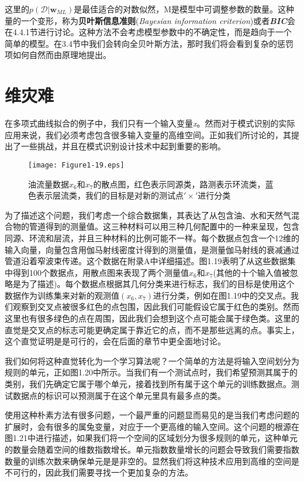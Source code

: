 	这里的$p(\mathcal{D}| \textbf{w}_{ML})$是最佳适合的对数似然，M是模型中可调整参数的数量。这种量的一个变形，称为\textbf{贝叶斯信息准则}(\textit{Bayesian information criterion})或者\textit{\textbf{BIC}}会在4.4.1节进行讨论。这种方法不会考虑模型参数中的不确定性，而是趋向于一个简单的模型。在3.4节中我们会转向全贝叶斯方法，那时我们将会看到复杂的惩罚项如何自然而由原理地提出。
	
\section{维灾难}
	在多项式曲线拟合的例子中，我们只有一个输入变量\textit{x}。然而对于模式识别的实际应用来说，我们必须考虑包含很多输入变量的高维空间。正如我们所讨论的，其提出了一些挑战，并且在模式识别设计技术中起到重要的影响。
	
	\begin{figure}[t]
		\parbox{.4\textwidth}{\caption{ 油流量数据$x_6$和$x_7$的散点图，红色表示同源类，路测表示环流类，蓝色表示层流类，我们的目标是对新的测试点$'\times'$进行分类 }}
		\parbox{.5\textwidth}{\texttt{[image: Figure1-19.eps]}}
	\end{figure}
	
	为了描述这个问题，我们考虑一个综合数据集，其表达了从包含油、水和天然气混合物的管道得到的测量值。这三种材料可以用三种几何配置中的一种来呈现，包含同源、环流和层流，并且三种材料的比例可能不一样。每个数据点包含一个12维的输入向量，向量包含用伽马射线密度计得到的测量值，是测量伽马射线的衰减通过管道沿着窄波束传递。这个数据在附录A中详细描述。图1.19表明了从这些数据集中得到100个数据点，用散点图来表现了两个测量值$x_6$和$x_7$(其他的十个输入值被忽略是为了描述)。每个数据点根据其几何分类来进行标志，我们的目标是使用这个数据作为训练集来对新的观测值$(x_6, x_7)$进行分类，例如在图1.19中的交叉点。我们观察到交叉点被很多红色的点包围，因此我们可能假设它属于红色的类别。然而这里也有很多绿色的点在周围，因此我们会想到这个点可能会属于绿色类。这里的直觉是交叉点的标志可能更确定属于靠近它的点，而不是那些远离的点。事实上，这个直觉证明是是可行的，会在后面的章节中更全面地讨论。
	
	我们如何将这种直觉转化为一个学习算法呢？一个简单的方法是将输入空间划分为规则的单元，正如图1.20中所示。当我们有一个测试点时，我们希望预测其属于的类别，我们先确定它属于哪个单元，接着找到所有属于这个单元的训练数据点。测试数据点的标识可以预测属于在这个单元里具有最多点的类。
	
	使用这种朴素方法有很多问题，一个最严重的问题显而易见的是当我们考虑问题的扩展时，会有很多的属兔变量，对应于一个更高维的输入空间。这个问题的根源在图1.21中进行描述，如果我们将一个空间的区域划分为很多规则的单元，这种单元的数量会随着空间的维数指数增长。单元指数数量增长的问题会导致我们需要指数数量的训练次数来确保单元是是非空的。显然我们将这种技术应用到高维的空间是不可行的，因此我们需要寻找一个更加复杂的方法。
	
